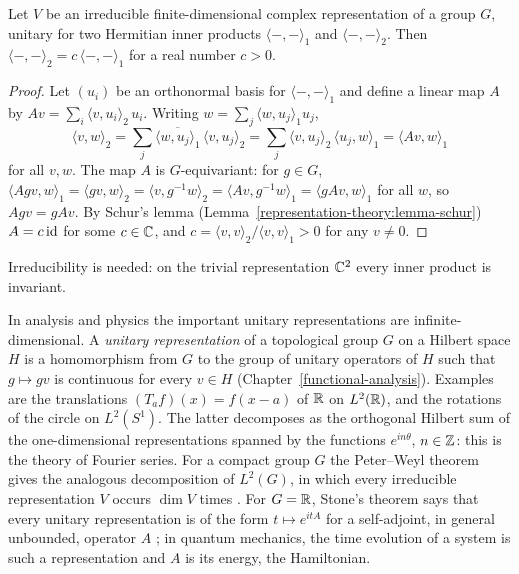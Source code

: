 \begin{proposition}\label{representation-theory:proposition-unitary-unique}
Let $V$ be an irreducible finite-dimensional complex representation of a group $G$, unitary for two Hermitian inner products $\langle -, - \rangle_1$ and $\langle -, - \rangle_2$. Then
$\langle -, - \rangle_2 = c\,\langle -, - \rangle_1$ for a real number $c > 0$.
\end{proposition}

\begin{proof}
Let $(u_i)$ be an orthonormal basis for $\langle -, - \rangle_1$ and define a linear map $A$ by $Av = \sum_i\langle v, u_i\rangle_2\,u_i$. Writing $w = \sum_j\langle w, u_j\rangle_1u_j$,
\[
\langle v, w\rangle_2 = \sum_j\overline{\langle w, u_j\rangle_1}\,\langle v, u_j\rangle_2 = \sum_j\langle v, u_j\rangle_2\,\langle u_j, w\rangle_1 = \langle Av, w\rangle_1
\]
for all $v, w$. The map $A$ is $G$-equivariant: for $g \in G$,
$\langle Agv, w\rangle_1 = \langle gv, w\rangle_2 = \langle v, g^{-1}w\rangle_2 = \langle Av, g^{-1}w\rangle_1 = \langle gAv, w\rangle_1$ for all $w$, so $Agv = gAv$. By Schur's lemma
(Lemma~\ref{representation-theory:lemma-schur}) $A = c\,\mathrm{id}$ for some $c \in \mathbb{C}$, and $c = \langle v, v\rangle_2/\langle v, v\rangle_1 > 0$ for any $v \neq 0$.
\end{proof}

Irreducibility is needed: on the trivial representation $\mathbb{C}^2$ every inner product is invariant.

\begin{remark}\label{representation-theory:remark-unitary-infinite}
In analysis and physics the important unitary representations are infinite-dimensional. A \emph{unitary representation} of a topological group $G$ on a Hilbert space $H$ is a homomorphism
from $G$ to the group of unitary operators of $H$ such that $g \mapsto gv$ is continuous for every $v \in H$ (Chapter~\ref{functional-analysis}). Examples are the translations
$(T_af)(x) = f(x - a)$ of $\mathbb{R}$ on $L^2(\mathbb{R})$, and the rotations of the circle on $L^2(S^1)$. The latter decomposes as the orthogonal Hilbert sum of the one-dimensional representations
spanned by the functions $e^{in\theta}$, $n \in \mathbb{Z}$: this is the theory of Fourier series. For a compact group $G$ the Peter--Weyl theorem gives the analogous decomposition of $L^2(G)$, in
which every irreducible representation $V$ occurs $\dim V$ times \cite[Chapter III]{brocker-tomdieck}. For $G = \mathbb{R}$, Stone's theorem says that every unitary representation is of the form
$t \mapsto e^{itA}$ for a self-adjoint, in general unbounded, operator $A$ \cite[Theorem VIII.8]{reed-simon-1}; in quantum mechanics, the time evolution of a system is such a representation and
$A$ is its energy, the Hamiltonian.
\end{remark}

